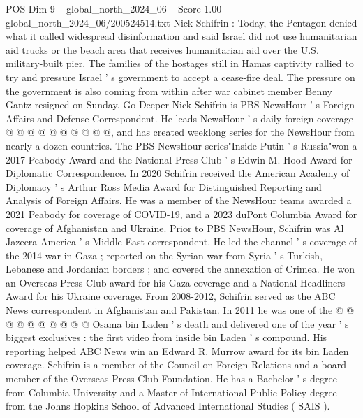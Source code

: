 \begin{textsample}{POS Dim 9 – global\_north\_2024\_06 – Score 1.00 – global\_north\_2024\_06/200524514.txt}
Nick Schifrin : Today, the Pentagon denied what it called widespread disinformation and said Israel did not use humanitarian aid trucks or the beach area that receives humanitarian aid over the U.S. military-built pier.
The families of the hostages still in Hamas captivity rallied to try and pressure Israel ' s government to accept a cease-fire deal.
The pressure on the government is also coming from within after war cabinet member Benny Gantz resigned on Sunday.
Go Deeper Nick Schifrin is PBS NewsHour ' s Foreign Affairs and Defense Correspondent.
He leads NewsHour ' s daily foreign coverage @ @ @ @ @ @ @ @ @ @, and has created weeklong series for the NewsHour from nearly a dozen countries.
The PBS NewsHour series"Inside Putin ' s Russia"won a 2017 Peabody Award and the National Press Club ' s Edwin M.
Hood Award for Diplomatic Correspondence.
In 2020 Schifrin received the American Academy of Diplomacy ' s Arthur Ross Media Award for Distinguished Reporting and Analysis of Foreign Affairs.
He was a member of the NewsHour teams awarded a 2021 Peabody for coverage of COVID-19, and a 2023 duPont Columbia Award for coverage of Afghanistan and Ukraine.
Prior to PBS NewsHour, Schifrin was Al Jazeera America ' s Middle East correspondent.
He led the channel ' s coverage of the 2014 war in Gaza ; reported on the Syrian war from Syria ' s Turkish, Lebanese and Jordanian borders ; and covered the annexation of Crimea.
He won an Overseas Press Club award for his Gaza coverage and a National Headliners Award for his Ukraine coverage.
From 2008-2012, Schifrin served as the ABC News correspondent in Afghanistan and Pakistan.
In 2011 he was one of the @ @ @ @ @ @ @ @ @ @ Osama bin Laden ' s death and delivered one of the year ' s biggest exclusives : the first video from inside bin Laden ' s compound.
His reporting helped ABC News win an Edward R.
Murrow award for its bin Laden coverage.
Schifrin is a member of the Council on Foreign Relations and a board member of the Overseas Press Club Foundation.
He has a Bachelor ' s degree from Columbia University and a Master of International Public Policy degree from the Johns Hopkins School of Advanced International Studies ( SAIS ).

\end{textsample}
